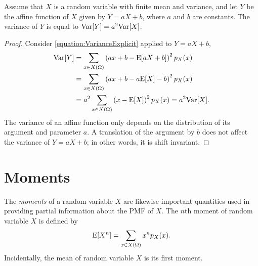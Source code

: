 \begin{proposition}
Assume that $X$ is a random variable with finite mean and variance, and let $Y$ be the affine function of $X$ given by $Y = aX + b$, where $a$ and $b$ are constants.
The variance of $Y$ is equal to $\mathrm{Var} [Y] = a^2 \mathrm{Var} [X]$.
\end{proposition}
\begin{proof}
Consider \eqref{equation:VarianceExplicit} applied to $Y = aX + b$,
\begin{equation*}
\begin{split}
\mathrm{Var} [Y]
&= \sum_{x \in X(\Omega)} \left( ax + b - \mathrm{E} [aX + b] \right)^2 p_X(x) \\
&= \sum_{x \in X(\Omega)} \left( ax + b - a \mathrm{E} [X] - b \right)^2 p_X(x) \\
&= a^2 \sum_{x \in X(\Omega)} \left( x - \mathrm{E} [X] \right)^2 p_X(x)
= a^2 \mathrm{Var} [X] .
\end{split}
\end{equation*}
The variance of an affine function only depends on the distribution of its argument and parameter $a$.
A translation of the argument by $b$ does not affect the variance of $Y = aX + b$;
in other words, it is shift invariant.
\end{proof}


\section{Moments}

The \emph{moments} of a random variable $X$ are likewise important quantities used in providing partial information about the PMF of $X$. 
The $n$th moment of random variable $X$ is defined by
\begin{equation} \label{equation:DiscreteMoments}
\mathrm{E} [X^n] = \sum_{x \in X(\Omega)} x^n p_X (x) .
\end{equation}
Incidentally, the mean of random variable $X$ is its first moment.

